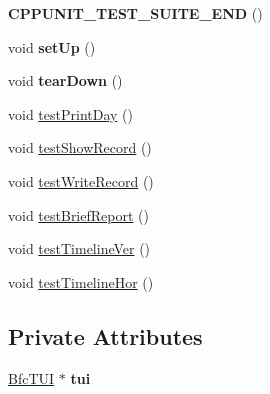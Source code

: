 \begin{DoxyCompactItemize}
\item 
\hypertarget{classFixtureBfcTUI_ad6e1b7f4c9f203f5658bffe053308099}{{\bfseries C\-P\-P\-U\-N\-I\-T\-\_\-\-T\-E\-S\-T\-\_\-\-S\-U\-I\-T\-E\-\_\-\-E\-N\-D} ()}\label{classFixtureBfcTUI_ad6e1b7f4c9f203f5658bffe053308099}

\item 
\hypertarget{classFixtureBfcTUI_a3010f0f9937f15195e495ea9a1e5ab6f}{void {\bfseries set\-Up} ()}\label{classFixtureBfcTUI_a3010f0f9937f15195e495ea9a1e5ab6f}

\item 
\hypertarget{classFixtureBfcTUI_ab4463e013d6dbc615ce48ff89c930b04}{void {\bfseries tear\-Down} ()}\label{classFixtureBfcTUI_ab4463e013d6dbc615ce48ff89c930b04}

\item 
void \hyperlink{classFixtureBfcTUI_a0e6e249a57e8679db2fe58e606986b95}{test\-Print\-Day} ()
\item 
void \hyperlink{classFixtureBfcTUI_a8b307755f136be0db22d450e9724bf2a}{test\-Show\-Record} ()
\item 
void \hyperlink{classFixtureBfcTUI_a4a099462414f1ee59f0458e7ba35857f}{test\-Write\-Record} ()
\item 
void \hyperlink{classFixtureBfcTUI_adbbb524adf16d7057835ea25c4a13369}{test\-Brief\-Report} ()
\item 
void \hyperlink{classFixtureBfcTUI_aef00e5a6e84b832da4ec58aa1f804d33}{test\-Timeline\-Ver} ()
\item 
void \hyperlink{classFixtureBfcTUI_a84e72246b10ab731470fcb9818f452e2}{test\-Timeline\-Hor} ()
\end{DoxyCompactItemize}
\subsection*{Private Attributes}
\begin{DoxyCompactItemize}
\item 
\hypertarget{classFixtureBfcTUI_ac3c3908c2c87a93f297e6b742fafd68e}{\hyperlink{classBfcTUI}{Bfc\-T\-U\-I} $\ast$ {\bfseries tui}}\label{classFixtureBfcTUI_ac3c3908c2c87a93f297e6b742fafd68e}

\end{DoxyCompactItemize}


